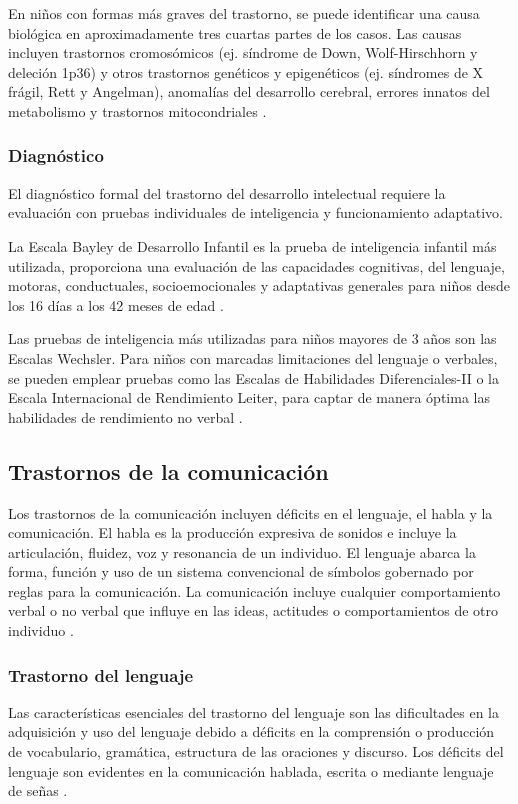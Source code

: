 En niños con formas más graves del trastorno, se puede identificar una causa
biológica en aproximadamente tres cuartas partes de los casos. Las causas
incluyen trastornos cromosómicos (ej. síndrome de Down, Wolf-Hirschhorn y
deleción 1p36) y otros trastornos genéticos y epigenéticos (ej. síndromes de X
frágil, Rett y Angelman), anomalías del desarrollo cerebral, errores innatos del
metabolismo y trastornos mitocondriales \cite{Nelson56}.

\subsubsection{Diagnóstico}
El diagnóstico formal del trastorno del desarrollo intelectual requiere la
evaluación con pruebas individuales de inteligencia y funcionamiento
adaptativo.

La Escala Bayley de Desarrollo Infantil es la prueba de inteligencia infantil
más utilizada, proporciona una evaluación de las capacidades cognitivas, del
lenguaje, motoras, conductuales, socioemocionales y adaptativas generales para
niños desde los 16 días a los 42 meses de edad \cite{Nelson56}.

Las pruebas de inteligencia más utilizadas para niños mayores de 3 años son las
Escalas Wechsler. Para niños con marcadas limitaciones del lenguaje o verbales,
se pueden emplear pruebas como las Escalas de Habilidades Diferenciales-II o la
Escala Internacional de Rendimiento Leiter, para captar de manera óptima las
habilidades de rendimiento no verbal \cite{Nelson56}.

\subsection{Trastornos de la comunicación}
Los trastornos de la comunicación incluyen déficits en el lenguaje, el habla y
la comunicación. El habla es la producción expresiva de sonidos e incluye la
articulación, fluidez, voz y resonancia de un individuo. El lenguaje abarca la
forma, función y uso de un sistema convencional de símbolos gobernado por reglas
para la comunicación. La comunicación incluye cualquier comportamiento verbal o
no verbal que influye en las ideas, actitudes o comportamientos de otro
individuo \cite{DSM5TR}.

\subsubsection{Trastorno del lenguaje}
Las características esenciales del trastorno del lenguaje son las dificultades
en la adquisición y uso del lenguaje debido a déficits en la comprensión o
producción de vocabulario, gramática, estructura de las oraciones y discurso.
Los déficits del lenguaje son evidentes en la comunicación hablada, escrita o
mediante lenguaje de señas \cite{DSM5TR}.

